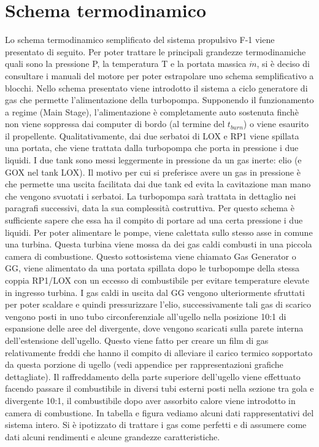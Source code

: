 \section{Schema termodinamico}
\label{sec:schema termodinamico}

Lo schema termodinamico semplificato del sistema propulsivo F-1 viene presentato di seguito. Per poter trattare le principali grandezze termodinamiche quali sono la pressione P, la temperatura T e la portata massica $\dot{m}$, si è deciso di consultare i manuali del motore per poter estrapolare uno schema semplificativo a blocchi. \cite{engine_manual} Nello schema presentato viene introdotto il sistema a ciclo generatore di gas che permette l’alimentazione della turbopompa. Supponendo il funzionamento a regime (Main Stage), l’alimentazione è completamente auto sostenuta finchè non viene soppressa dai computer di bordo (al termine del $t_{burn}$) o viene esaurito il propellente. 
Qualitativamente, dai due serbatoi di LOX e RP1 viene spillata una portata, che viene trattata dalla turbopompa che porta in pressione i due liquidi. I due tank sono messi leggermente in pressione da un gas inerte: elio (e GOX nel tank LOX). Il motivo per cui si preferisce avere un gas in pressione è che permette una uscita facilitata dai due tank ed evita la cavitazione man mano che vengono svuotati i serbatoi. La turbopompa sarà trattata in dettaglio nei paragrafi successivi, data la sua complessità costruttiva. Per questo schema è sufficiente sapere che essa ha il compito di portare ad una certa pressione i due liquidi. Per poter alimentare le pompe, viene calettata sullo stesso asse in comune una turbina. Questa turbina viene mossa da dei gas caldi combusti in una piccola camera di combustione. Questo sottosistema viene chiamato Gas Generator o GG, viene alimentato da una portata spillata dopo le turbopompe della stessa coppia RP1/LOX con un eccesso di combustibile per evitare temperature elevate in ingresso turbina. I gas caldi in uscita dal GG vengono ulteriormente sfruttati per poter scaldare e quindi pressurizzare l’elio, successivamente tali gas di scarico vengono posti in uno tubo circonferenziale all’ugello nella posizione 10:1 di espansione delle aree del divergente, dove vengono scaricati sulla parete interna dell’estensione dell’ugello. Questo viene fatto per creare un film di gas relativamente freddi che hanno il compito di alleviare il carico termico sopportato da questa porzione di ugello (vedi appendice per rappresentazioni grafiche dettagliate). Il raffreddamento della parte superiore dell’ugello viene effettuato facendo passare il combustibile in diversi tubi esterni posti nella sezione tra gola e divergente 10:1, il combustibile dopo aver assorbito calore viene introdotto in camera di combustione. 
In tabella e figura vediamo alcuni dati rappresentativi del sistema intero. Si è ipotizzato di trattare i gas come perfetti e di assumere come dati alcuni rendimenti e alcune grandezze caratteristiche. 



